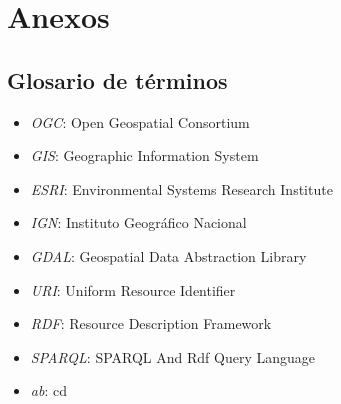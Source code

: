 \chapter{Anexos}
\section{Glosario de términos}
\begin{itemize}
    \item \textit{OGC}: Open Geospatial Consortium
    \item \textit{GIS}: Geographic Information System
    \item \textit{ESRI}: Environmental Systems Research Institute
    \item \textit{IGN}: Instituto Geográfico Nacional
    \item \textit{GDAL}: Geospatial Data Abstraction Library
    \item \textit{URI}: Uniform Resource Identifier
    \item \textit{RDF}: Resource Description Framework
    \item \textit{SPARQL}: SPARQL And Rdf Query Language
    \item \textit{ab}: cd
\end{itemize}





 
